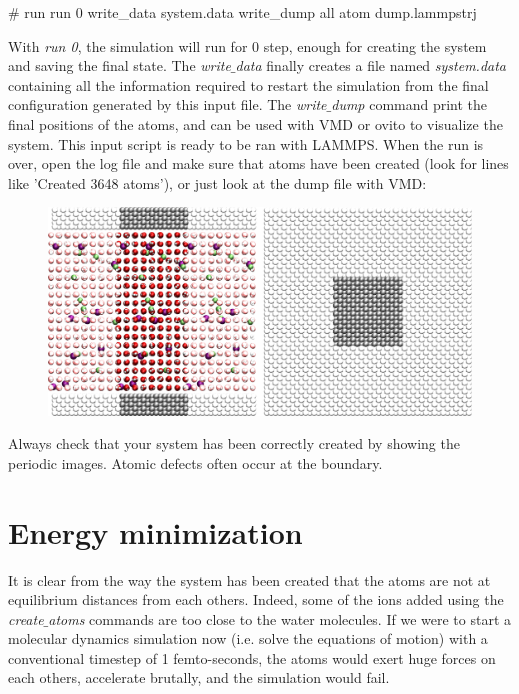 \begin{lcverbatim}
# run
run 0
write_data system.data
write_dump all atom dump.lammpstrj
\end{lcverbatim}

\noindent With \textit{run 0}, the simulation will run for 0 step,
enough for creating the system and saving the final state.
The \textit{write$\_$data} finally creates a file named \textit{system.data}
containing all the information required to restart the
simulation from the final configuration generated by this
input file.
The \textit{write$\_$dump} command print the final
positions of the atoms, and can be used with VMD or ovito
to visualize the system.
This input script is ready to be ran with LAMMPS. When the
run is over, open the log file and make sure that atoms have
been created (look for lines like 'Created 3648 atoms'), or
just look at the dump file with VMD:

\begin{figure}
\includegraphics[width=\linewidth]{tutorials/level2/nanosheared-electrolyte/systemcreation-light.png}
\end{figure}

Always check that your system has been correctly created
by showing the periodic images. Atomic defects often
occur at the boundary.

\section{Energy minimization}

\noindent \begin{tcolorbox}[colback=mylightblue!5!white,colframe=mylightblue!75!black,title=Why is energy minimization necessary?]
It is clear from the way the system has been created that
the atoms are not at equilibrium distances from each
others. Indeed, some of the ions added using the \textit{create$\_$atoms}
commands are too close to the water molecules.
If we were to start a molecular dynamics
simulation now (i.e. solve the equations of motion) with
a conventional timestep of 1 femto-seconds, the atoms
would exert huge forces on each others, accelerate
brutally, and the simulation would fail.
\end{tcolorbox}

